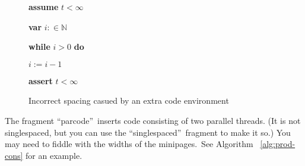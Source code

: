 \begin{figure}[tb]%
\begin{singlespaced}%

\begin{code}
\textbf{assume} $t<\infty $

\textbf{var} $i:\in \mathbb{N}$

\textbf{while} $i>0$ \textbf{do}

\begin{indent}
\item $i:=i-1$
\end{indent}
\end{code}

\begin{code}
\textbf{assert} $t<\infty $
\end{code}

\end{singlespaced}%
\caption{Incorrect spacing casued by an extra code environment}\label{fig:extra-code}
\end{figure}%

The fragment \textquotedblleft parcode\textquotedblright\ inserts code
consisting of two parallel threads. (It is not singlespaced, but you can use
the \textquotedblleft singlespaced\textquotedblright\ fragment to make it
so.) You may need to fiddle with the widths of the minipages.\ See Algorithm~%
\ref{alg:prod-cons} for an example.

